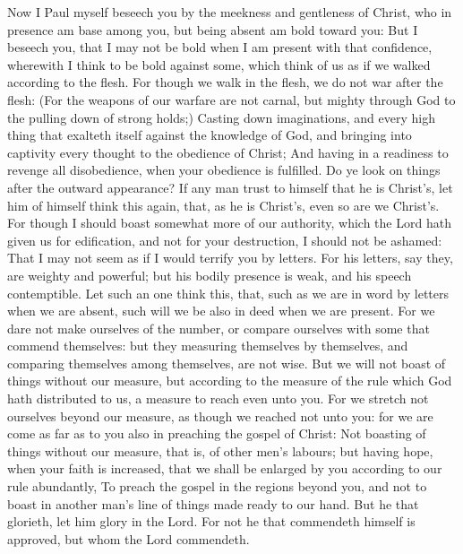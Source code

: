  Now I Paul myself beseech you by the meekness and
gentleness of Christ, who in presence am base among you, but being
absent am bold toward you:  But I beseech you, that I may
not be bold when I am present with that confidence, wherewith I think to
be bold against some, which think of us as if we walked according to the
flesh.  For though we walk in the flesh, we do not war after
the flesh:  (For the weapons of our warfare are not carnal,
but mighty through God to the pulling down of strong holds;)
 Casting down imaginations, and every high thing that
exalteth itself against the knowledge of God, and bringing into
captivity every thought to the obedience of Christ;  And
having in a readiness to revenge all disobedience, when your obedience
is fulfilled.  Do ye look on things after the outward
appearance? If any man trust to himself that he is Christ's, let him of
himself think this again, that, as he is Christ's, even so are we
Christ's.  For though I should boast somewhat more of our
authority, which the Lord hath given us for edification, and not for
your destruction, I should not be ashamed:  That I may not
seem as if I would terrify you by letters.  For his
letters, say they, are weighty and powerful; but his bodily presence is
weak, and his speech contemptible.  Let such an one think
this, that, such as we are in word by letters when we are absent, such
will we be also in deed when we are present.  For we dare
not make ourselves of the number, or compare ourselves with some that
commend themselves: but they measuring themselves by themselves, and
comparing themselves among themselves, are not wise.  But
we will not boast of things without our measure, but according to the
measure of the rule which God hath distributed to us, a measure to reach
even unto you.  For we stretch not ourselves beyond our
measure, as though we reached not unto you: for we are come as far as to
you also in preaching the gospel of Christ:  Not boasting
of things without our measure, that is, of other men's labours; but
having hope, when your faith is increased, that we shall be enlarged by
you according to our rule abundantly,  To preach the gospel
in the regions beyond you, and not to boast in another man's line of
things made ready to our hand.  But he that glorieth, let
him glory in the Lord.  For not he that commendeth himself
is approved, but whom the Lord commendeth.

